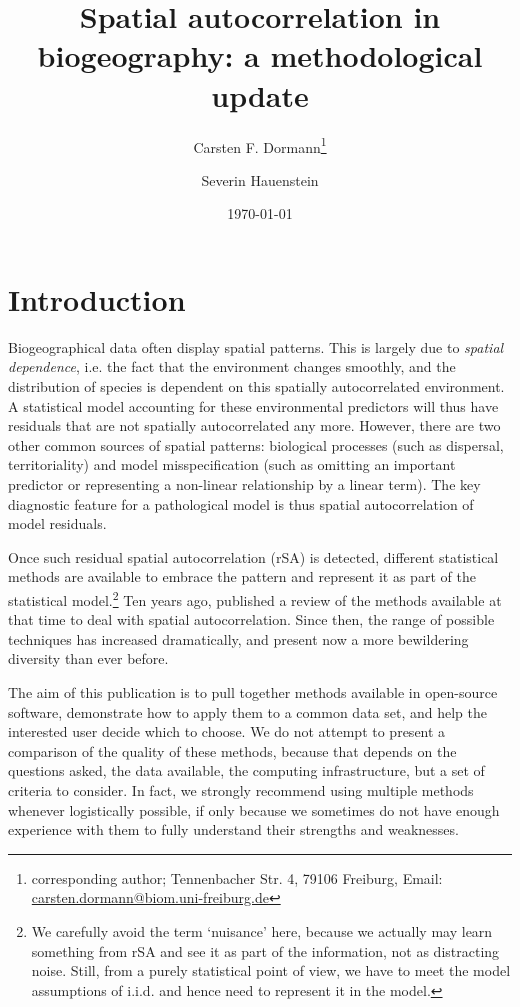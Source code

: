 \documentclass[11pt]{article}
\title{Spatial autocorrelation in biogeography: a methodological update}
\author[1]{Carsten F. Dormann\thanks{corresponding author; Tennenbacher Str. 4, 79106 Freiburg, Email: \url{carsten.dormann@biom.uni-freiburg.de}}}
\author[1]{Severin Hauenstein}
\affil[1]{Biometry and Environmental System Analysis, University of Freiburg, Germany}
\date{\today}                                           %
\begin{document}
\maketitle
\frenchspacing

\tableofcontents

\begin{abstract}

\end{abstract}

\section{Introduction}
Biogeographical data often display spatial patterns. This is largely due to \emph{spatial dependence}, i.e. the fact that the environment changes smoothly, and the distribution of species is dependent on this spatially autocorrelated environment. A statistical model accounting for these environmental predictors will thus have residuals that are not spatially autocorrelated any more. However, there are two other common sources of spatial patterns: biological processes (such as dispersal, territoriality) and model misspecification (such as omitting an important predictor or representing a non-linear relationship by a linear term). The key diagnostic feature for a pathological model is thus spatial autocorrelation of model residuals.

Once such residual spatial autocorrelation (rSA) is detected, different statistical methods are available to embrace the pattern and represent it as part of the statistical model.\footnote{We carefully avoid the term `nuisance' here, because we actually may learn something from rSA and see it as part of the information, not as distracting noise. Still, from a purely statistical point of view, we have to meet the model assumptions of i.i.d. and hence need to represent it in the model.} Ten years ago, \citet{Dormann2007} published a review of the methods available at that time to deal with spatial autocorrelation. Since then, the range of possible techniques has increased dramatically, and present now a more bewildering diversity than ever before. 

The aim of this publication is to pull together methods available in open-source software, demonstrate how to apply them to a common data set, and help the interested user decide which to choose. We do not attempt to present a comparison of the quality of these methods, because that depends on the questions asked, the data available, the computing infrastructure, but a set of criteria to consider. In fact, we strongly recommend using multiple methods whenever logistically possible, if only because we sometimes do not have enough experience with them to fully understand their strengths and weaknesses.
\end{document}
